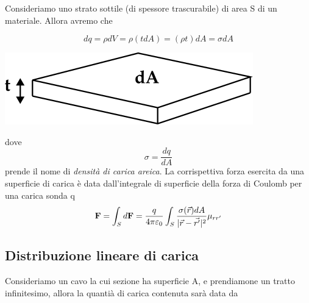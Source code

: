 Consideriamo uno strato sottile (di spessore trascurabile) di area S di un materiale. Allora avremo che 

\begin{minipage}{0.6\textwidth}
\begin{equation*}
dq = \rho dV = \rho (tdA) = (\rho t)dA = \sigma dA
\end{equation*}
\end{minipage}
\begin{minipage}{0.4\textwidth}
\centering
\includegraphics[width=\textwidth]{images/areica.png}
\end{minipage}
dove 
\begin{equation*}
	\sigma = \frac{dq}{dA}
\end{equation*}
prende il nome di \textit{densit\`a di carica areica}. La corrispettiva forza esercita da una superficie di carica \`e data dall'integrale di superficie della forza di Coulomb per una carica sonda q 
\begin{equation*}
	\bold{F} = \int_{S}d\bold{F} = \frac{q}{4 \pi \varepsilon_0} \int_{S} \frac{\sigma(\vec{r})dA}{|\vec{r}-\vec{r'}|^2} \mu_{rr'}
\end{equation*}

\subsection{Distribuzione lineare di carica}

Consideriamo un cavo  la cui sezione ha superficie A, e prendiamone un tratto infinitesimo, allora la quanti\`a di carica contenuta sar\`a data da

